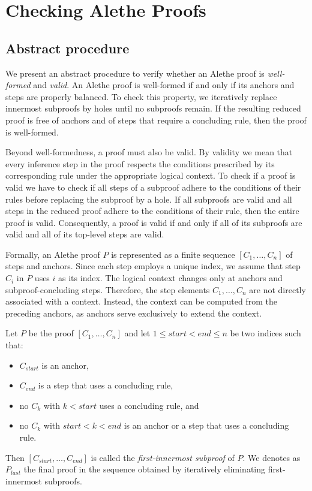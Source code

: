 \section{Checking Alethe Proofs}
\label{sec:checking-alethe-proofs}

\subsection{Abstract procedure}

We present an abstract procedure to verify whether an Alethe proof is \emph{well-formed} and \emph{valid}.
An Alethe proof is well-formed if and only if its anchors and steps are properly balanced.
To check this property, we iteratively replace innermost subproofs by holes until no subproofs remain.
If the resulting reduced proof is free of anchors and of steps that require a concluding rule, then the proof is well-formed.


Beyond well-formedness, a proof must also be valid.
By validity we mean that every inference step in the proof respects the conditions prescribed by its corresponding rule under the appropriate logical context.
To check if a proof is valid we have to check if all steps of a subproof adhere to the conditions of their rules before replacing the subproof by a hole.
If all subproofs are valid and all steps in the reduced proof adhere to the conditions of their rule, then the entire proof is valid.
Consequently, a proof is valid if and only if all of its subproofs are valid and all of its top-level steps are valid.

Formally, an Alethe proof $P$ is represented as a finite sequence $[C_1, \ldots, C_n]$ of steps and anchors.
Since each step employs a unique index, we assume that step $C_i$ in $P$ uses
$i$ as its index. The logical context changes only at anchors and subproof-concluding
steps. Therefore, the step elements $C_1, \ldots, C_n$ are not directly associated
with a context. Instead, the context can be computed from the preceding anchors,
as anchors serve exclusively to extend the context.


\begin{definition}\label{def:first-innermost}
Let $P$ be the proof $[C_1, \ldots, C_n]$ and let $1 \leq \mathit{start} < \mathit{end} \leq n$ be two indices such
that:
\begin{itemize}
\item $C_{\mathit{start}}$ is an anchor,
\item $C_{\mathit{end}}$ is a step that uses a concluding rule,
\item no $C_k$ with $k < \mathit{start}$ uses a concluding rule, and
\item no $C_k$ with $\mathit{start} < k < \mathit{end}$ is an anchor or a step that uses a concluding rule.
\end{itemize}
Then $[C_{\mathit{start}}, \ldots, C_{\mathit{end}}]$ is called the \emph{first-innermost subproof} of $P$.
We denotes as $P_{last}$ the final proof in the sequence obtained by iteratively eliminating first-innermost subproofs.
\end{definition}

